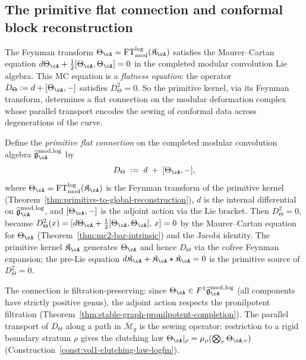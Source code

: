 
\subsection{The primitive flat connection and conformal block
reconstruction}
\label{subsec:primitive-flat-connection}

The Feynman transform
$\Theta_\cA =
\operatorname{FT}^{\log}_{\mathrm{mod}}(\mathfrak{K}_\cA)$
satisfies the Maurer--Cartan equation
$d\Theta_\cA + \tfrac{1}{2}[\Theta_\cA, \Theta_\cA] = 0$
in the completed modular convolution Lie algebra.
This MC equation is a \emph{flatness equation}: the operator
$D_\Theta := d + [\Theta_\cA, -]$ satisfies $D_\Theta^2 = 0$.
So the primitive kernel, via its Feynman transform, determines
a flat connection on the modular deformation complex whose
parallel transport encodes the sewing of conformal data across
degenerations of the curve.

\begin{construction}
\label{constr:primitive-flat-connection}
\ClaimStatusProvedHere
{}
Define the \emph{primitive flat connection} on the completed
modular convolution algebra
$\widehat{\mathfrak{g}}^{\mathrm{mod,log}}_\cA$ by
\begin{equation}
\label{eq:primitive-flat-connection}
D_{\Theta}
\;:=\;
d \;+\; [\Theta_\cA, -],
\end{equation}
where $\Theta_\cA =
\operatorname{FT}^{\log}_{\mathrm{mod}}(\mathfrak{K}_\cA)$
is the Feynman transform of the primitive kernel
(Theorem~\ref{thm:primitive-to-global-reconstruction}),
$d$ is the internal differential on
$\widehat{\mathfrak{g}}^{\mathrm{mod,log}}_\cA$, and
$[\Theta_\cA, -]$ is the adjoint action via the Lie bracket.
Then $D_{\Theta}^2 = 0$, because
$D_{\Theta}^2(x) = [d\Theta_\cA +
\tfrac{1}{2}[\Theta_\cA, \Theta_\cA],\, x] = 0$
by the Maurer--Cartan equation for $\Theta_\cA$
(Theorem~\ref{thm:mc2-bar-intrinsic})
and the Jacobi identity.  The primitive kernel
$\mathfrak{K}_\cA$ generates $\Theta_\cA$ and hence
$D_\Theta$ via the cofree Feynman expansion; the pre-Lie
equation $d\mathfrak{K}_\cA + \mathfrak{K}_\cA \star
\mathfrak{K}_\cA = 0$ is the primitive source of
$D_\Theta^2 = 0$.

The connection is filtration-preserving: since
$\Theta_\cA \in F^1\widehat{\mathfrak{g}}^{\mathrm{mod,log}}_\cA$
(all components have strictly positive genus),
the adjoint action respects the pronilpotent filtration
(Theorem~\ref{thm:stable-graph-pronilpotent-completion}).
The parallel transport of $D_\Theta$ along a path in
$\overline{\mathcal{M}}_g$ is the sewing operator: restriction to
a rigid boundary stratum $\rho$ gives the clutching law
$\Theta_\cA|_\rho = \mu_\rho(\bigotimes_v \Theta_{\cA,v})$
(Construction~\ref{const:vol1-clutching-law-logfm}).
\end{construction}

